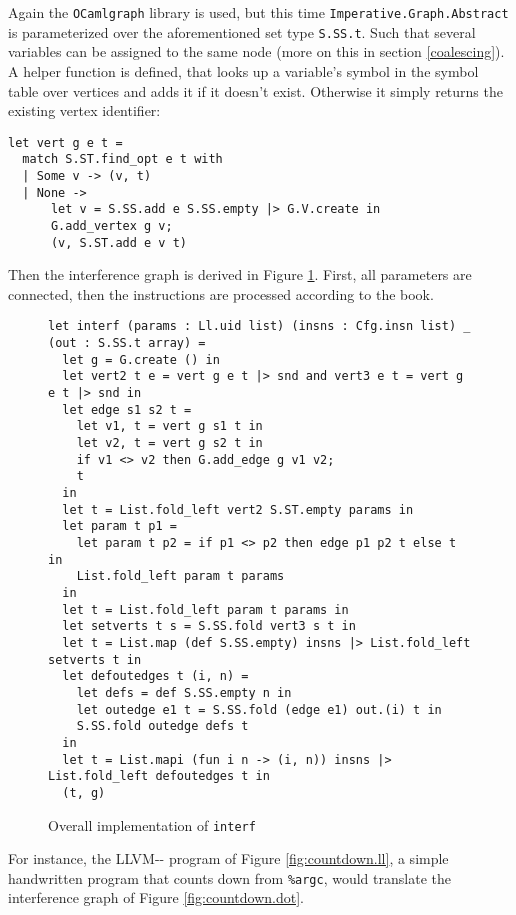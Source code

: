\documentclass{article}
\begin{document}
Again the \texttt{OCamlgraph} library is used, but this time \texttt{Imperative.Graph.Abstract} is parameterized over the aforementioned set type \texttt{S.SS.t}. %
Such that several variables can be assigned to the same node (more on this in section \ref{coalescing}). A helper function is defined, that looks up a variable's symbol in the symbol table over vertices and adds it if it doesn't exist. Otherwise it simply returns the existing vertex identifier:
\begin{verbatim}
let vert g e t =
  match S.ST.find_opt e t with
  | Some v -> (v, t)
  | None ->
      let v = S.SS.add e S.SS.empty |> G.V.create in
      G.add_vertex g v;
      (v, S.ST.add e v t)
\end{verbatim}
Then the interference graph is derived in Figure \ref{fig:interf}. First, all parameters are connected, then the instructions are processed according to the book.

\begin{figure}[H]
\begin{verbatim}
let interf (params : Ll.uid list) (insns : Cfg.insn list) _ (out : S.SS.t array) =
  let g = G.create () in
  let vert2 t e = vert g e t |> snd and vert3 e t = vert g e t |> snd in
  let edge s1 s2 t =
    let v1, t = vert g s1 t in
    let v2, t = vert g s2 t in
    if v1 <> v2 then G.add_edge g v1 v2;
    t
  in
  let t = List.fold_left vert2 S.ST.empty params in
  let param t p1 =
    let param t p2 = if p1 <> p2 then edge p1 p2 t else t in
    List.fold_left param t params
  in
  let t = List.fold_left param t params in
  let setverts t s = S.SS.fold vert3 s t in
  let t = List.map (def S.SS.empty) insns |> List.fold_left setverts t in
  let defoutedges t (i, n) =
    let defs = def S.SS.empty n in
    let outedge e1 t = S.SS.fold (edge e1) out.(i) t in
    S.SS.fold outedge defs t
  in
  let t = List.mapi (fun i n -> (i, n)) insns |> List.fold_left defoutedges t in
  (t, g)
\end{verbatim}
\caption{Overall implementation of \texttt{interf}\label{fig:interf}}
\end{figure}

\noindent For instance, the LLVM-{}- program of Figure \ref{fig:countdown.ll}, a simple handwritten program that counts down from \texttt{\%argc}, would translate the interference graph of Figure \ref{fig:countdown.dot}. %
\end{document}
